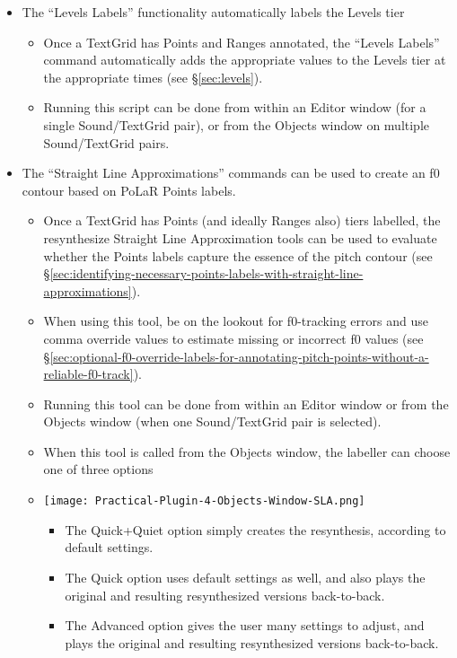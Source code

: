 \begin{itemize}
	\item The “Levels Labels” functionality automatically labels the Levels tier
	\begin{itemize}
		\item Once a TextGrid has Points and Ranges annotated, the “Levels Labels” command automatically adds the appropriate values to the Levels tier at the appropriate times (see §\ref{sec:levels}).
		\item Running this script can be done from within an Editor window (for a single Sound\slash TextGrid pair), or from the Objects window on multiple Sound\slash TextGrid pairs.
	\end{itemize}
	\item The “Straight Line Approximations” commands can be used to create an f0 contour based on PoLaR Points labels.
	\begin{itemize}
		\item Once a TextGrid has Points (and ideally Ranges also) tiers labelled, the resynthesize Straight Line Approximation tools can be used to evaluate whether the Points labels capture the essence of the pitch contour (see §\ref{sec:identifying-necessary-points-labels-with-straight-line-approximations}).
		\item When using this tool, be on the lookout for f0-tracking errors and use comma override values to estimate missing or incorrect f0 values (see §\ref{sec:optional-f0-override-labels-for-annotating-pitch-points-without-a-reliable-f0-track}). 
		\item Running this tool can be done from within an Editor window or from the Objects window (when one Sound\slash TextGrid pair is selected).
		\item When this tool is called from the Objects window, the labeller can choose one of three options
		\item[] \texttt{[image: Practical-Plugin-4-Objects-Window-SLA.png]}
		\begin{itemize}
			\item The Quick+Quiet option simply creates the resynthesis, according to default settings.
			\item The Quick option uses default settings as well, and also plays the original and resulting resynthesized versions back-to-back.
			\item The Advanced option gives the user many settings to adjust, and plays the original and resulting resynthesized versions back-to-back.
		\end{itemize}

\end{itemize}
\end{itemize}
